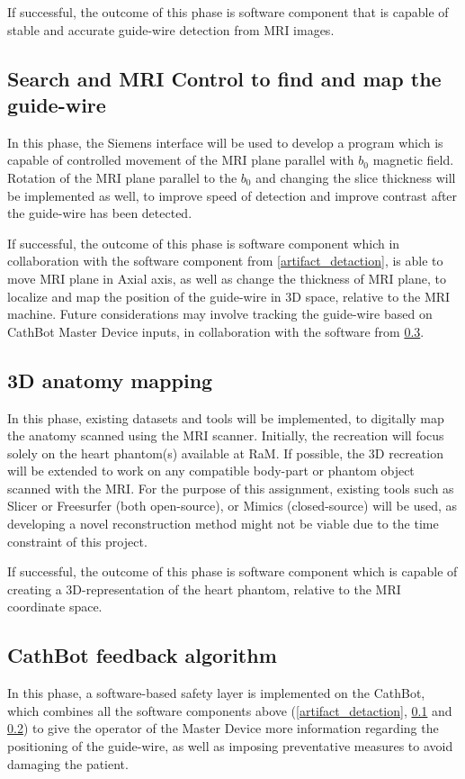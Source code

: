 \documentclass{article}
\begin{document}
If successful, the outcome of this phase is software component that is capable of stable and accurate guide-wire detection from MRI images.

\subsection{Search and MRI Control to find and map the guide-wire}
\label{mri_search_control}
In this phase, the Siemens interface will be used to develop a program which is capable of controlled movement of the MRI plane parallel with $b_0$ magnetic field. Rotation of the MRI plane parallel to the $b_0$ and changing the slice thickness will be implemented as well, to improve speed of detection and improve contrast after the guide-wire has been detected. 

If successful, the outcome of this phase is software component which in collaboration with the software component from \ref{artifact_detaction}, is able to move MRI plane in Axial axis, as well as change the thickness of MRI plane, to localize and map the position of the guide-wire in 3D space, relative to the MRI machine. Future considerations may involve tracking the guide-wire based on CathBot Master Device inputs, in collaboration with the software from \ref{feedback_algorithm}.

\subsection{3D anatomy mapping}
\label{anatomy_mapping}
In this phase, existing datasets and tools will be implemented, to digitally map the anatomy scanned using the MRI scanner. Initially, the recreation will focus solely on the heart phantom(s) available at RaM. If possible, the 3D recreation will be extended to work on any compatible body-part or phantom object scanned with the MRI.
For the purpose of this assignment, existing tools such as Slicer\cite{slicer} or Freesurfer\cite{freesurfer} (both open-source), or Mimics\cite{mimics} (closed-source) will be used, as developing a novel reconstruction method might not be viable due to the time constraint of this project.

If successful, the outcome of this phase is software component which is capable of creating a 3D-representation of the heart phantom, relative to the MRI coordinate space.

\subsection{CathBot feedback algorithm}
\label{feedback_algorithm}
In this phase, a software-based safety layer is implemented on the CathBot, which combines all the software components above (\ref{artifact_detaction}, \ref{mri_search_control} and \ref{anatomy_mapping}) to give the operator of the Master Device more information regarding the positioning of the guide-wire, as well as imposing preventative measures to avoid damaging the patient. 
\end{document}
